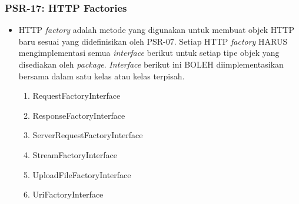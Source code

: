 \subsubsection{PSR-17: HTTP Factories}
\label{subsubsec:psr17}
\begin{itemize}
	\item HTTP \textit{factory} adalah metode yang digunakan untuk membuat objek HTTP baru sesuai yang didefinisikan oleh PSR-07. Setiap HTTP \textit{factory} HARUS mengimplementasi semua \textit{interface} berikut untuk setiap tipe objek yang disediakan oleh \textit{package}. \textit{Interface} berikut ini BOLEH diimplementasikan bersama dalam satu kelas atau kelas terpisah.
	\begin{enumerate}
		\item RequestFactoryInterface
		\item ResponseFactoryInterface
		\item ServerRequestFactoryInterface
		\item StreamFactoryInterface
		\item UploadFileFactoryInterface
		\item UriFactoryInterface
	\end{enumerate} 
\end{itemize}

